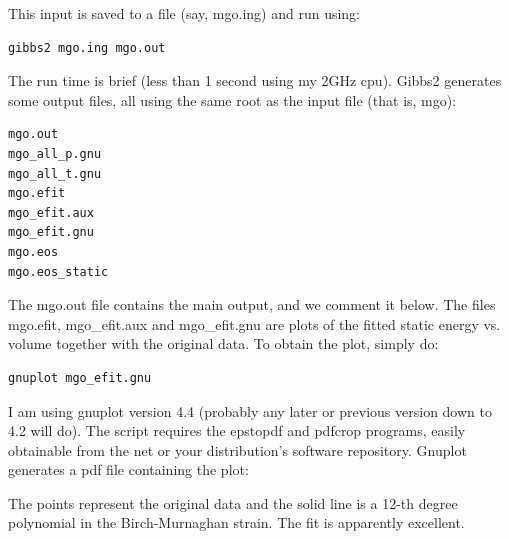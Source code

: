 \documentclass[a4paper]{article}
\begin{document}
This input is saved to a file (say, mgo.ing) and run using:
%
\asciilist
\begin{lstlisting}
gibbs2 mgo.ing mgo.out
\end{lstlisting}

The run time is brief (less than 1 second using my 2GHz cpu). Gibbs2
generates some output files, all using the same root as the input file
(that is, mgo):
%
\asciilist
\begin{lstlisting}
mgo.out
mgo_all_p.gnu
mgo_all_t.gnu
mgo.efit
mgo_efit.aux
mgo_efit.gnu
mgo.eos
mgo.eos_static
\end{lstlisting}

The mgo.out file contains the main output, and we comment it
below. The files mgo.efit, mgo\_efit.aux and mgo\_efit.gnu are plots of
the fitted static energy vs. volume together with the original
data. To obtain the plot, simply do:
%
\asciilist
\begin{lstlisting}
gnuplot mgo_efit.gnu
\end{lstlisting}

I am using gnuplot version 4.4 (probably any later or previous version
down to 4.2 will do). The script requires the epstopdf and pdfcrop
programs, easily obtainable from the net or your distribution's
software repository. Gnuplot generates a pdf file containing the plot:

\noindent{}

The points represent the original data and the solid line is a 12-th
degree polynomial in the Birch-Murnaghan strain. The fit is apparently
excellent.
\end{document}
